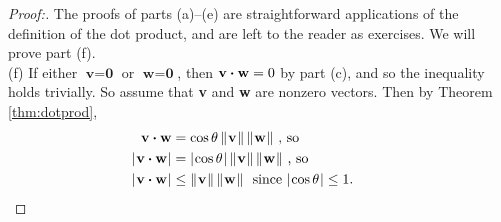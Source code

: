 \begin{proofbar}\begin{proof}[Proof:]
 The proofs of parts (a)--(e) are straightforward applications of the definition of the dot product, and are left
 to the reader as exercises. We will prove part (f).\\(f)
 If either $\textbf{v} = \textbf{0}$ or $\textbf{w} = \textbf{0}$, then $\textbf{v} \bm{\cdot} \textbf{w} = 0$
 by part (c), and so the inequality holds trivially. So assume that \textbf{v} and \textbf{w} are nonzero vectors. Then
 by Theorem \ref{thm:dotprod},
 \begin{align*}
  \textbf{v} \bm{\cdot} \textbf{w} &= \cos \theta \, \lVert\mspace{1mu}\textbf{v}\mspace{1mu}\rVert\,\lVert\mspace{1mu}\textbf{w}\mspace{1mu}\rVert \text{~,~so}\\
  \lvert\mspace{1mu}\textbf{v} \bm{\cdot} \textbf{w}\mspace{1mu}\rvert &= \lvert\mspace{1mu}\cos \theta\mspace{1mu}\rvert \, \lVert\mspace{1mu}\textbf{v}\mspace{1mu}\rVert\,\lVert\mspace{1mu}\textbf{w}\mspace{1mu}\rVert \text{~,~so}\\
  \lvert\mspace{1mu}\textbf{v} \bm{\cdot} \textbf{w}\mspace{1mu}\rvert &\le \lVert\mspace{1mu}\textbf{v}\mspace{1mu}\rVert\,\lVert\mspace{1mu}\textbf{w}\mspace{1mu}\rVert
   \text{~~since $\lvert\mspace{1mu}\cos \theta\mspace{1mu}\rvert \le 1$. \qquad \qedhere}
 \end{align*}
\end{proof}\end{proofbar}

